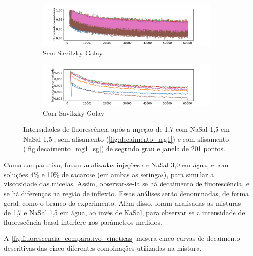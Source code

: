 	\begin{figure}[h]
		\begin{subfigure}{\textwidth}
			\centering
			\includegraphics[width=\textwidth]{imagens/fluor/decaimento_mg1}
			\caption{Sem Savitzky-Golay}
			\label{fig:decaimento_mg1}
		\end{subfigure}

		\begin{subfigure}{\textwidth}
			\centering
			\includegraphics[width=\textwidth]{imagens/fluor/decaimento_mg1_SG}
			\caption{Com Savitzky-Golay}
			\label{fig:decaimento_mg1_sg}
		\end{subfigure}
		
		\caption{Intensidades de fluorescência após a injeção de \TTAB{} 1,7 \mM{} com NaSal 1,5 \mM{} em NaSal 1,5 \mM{}, sem alisamento (\autoref{fig:decaimento_mg1}) e com alisamento (\autoref{fig:decaimento_mg1_sg}) de segundo grau e janela de 201 pontos.}
		\label{fig:decaimento_fluorescencia_mg1}
	\end{figure}	


	\FloatBarrier
	
	Como comparativo, foram analisadas injeções de NaSal 3,0 \mM{} em água, e com soluções 4\% e 10\% de sacarose (em ambas as seringas), para simular a viscosidade das micelas. Assim, observar-se-ia se há decaimento de fluorescência, e se há diferenças na região de inflexão. Essas análises serão denominadas, de forma geral, como o branco do experimento.  Além disso, foram analisadas as misturas de \TTAB{} 1,7 \mM{} e NaSal 1,5 \mM{} em água, ao invés de NaSal, para observar se a intensidade de fluorescência basal interfere nos parâmetros medidos.
	
	A \autoref{fig:fluorescencia_comparativo_cineticas} mostra cinco curvas de decaimento descritivas das cinco diferentes combinações utilizadas na mistura.
	
